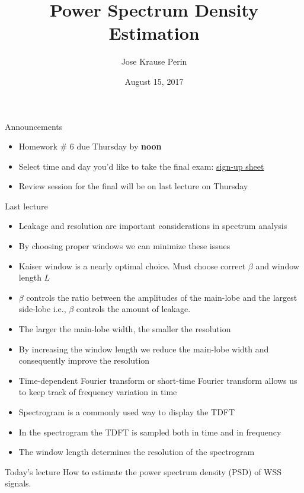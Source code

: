 \documentclass[10pt]{beamer}
\title[EE 264]{Power Spectrum Density Estimation}
\author{Jose Krause Perin}
\institute{Stanford University}
\date{August 15, 2017}
\begin{document}
\begin{frame}
  \titlepage
\end{frame}

%
\begin{frame}{Announcements}
\begin{itemize}
	\item Homework \# 6 due Thursday by \textbf{noon}
	\item Select time and day you'd like to take the final exam: \href{https://docs.google.com/spreadsheets/d/1fps6RCAxMloZ0jjxLB7DXeVGF_Vi5WAW8vqnk6T3erU}{sign-up sheet}
	\item Review session for the final will be on last lecture on Thursday
\end{itemize}
\end{frame}

%
\begin{frame}{Last lecture}
\begin{itemize}
	\item Leakage and resolution are important considerations in spectrum analysis
	\item By choosing proper windows we can minimize these issues
	\item Kaiser window is a nearly optimal choice. Must choose correct $\beta$ and window length $L$
	\item $\beta$ controls the ratio between the amplitudes of the main-lobe and the largest side-lobe i.e., $\beta$ controls the amount of leakage.
	\item The larger the main-lobe width, the smaller the resolution
	\item By increasing the window length we reduce the main-lobe width and consequently improve the resolution
	\item Time-dependent Fourier transform or short-time Fourier transform allows us to keep track of frequency variation in time
	\item Spectrogram is a commonly used way to display the TDFT
	\item In the spectrogram the TDFT is sampled both in time and in frequency
	\item The window length determines the resolution of the spectrogram
\end{itemize}
\end{frame}

%
\begin{frame}{Today's lecture}
	How to estimate the power spectrum density (PSD) of WSS signals.
	\tableofcontents
\end{frame}
\end{document}
